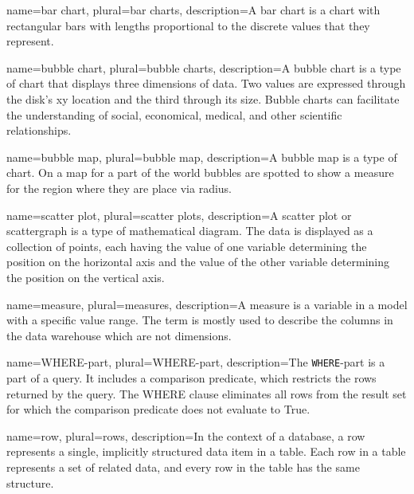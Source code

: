 {
  name=bar chart,
  plural=bar charts,
  description={A bar chart is a \gls{chart} with rectangular bars with lengths proportional to the discrete values that
  they represent.  
  }
}


{
  name=bubble chart,
  plural=bubble charts,
  description={A bubble chart is a type of chart that displays three 
  dimensions of data. Two values are expressed through the disk's xy location and the third 
  through its size. Bubble charts can facilitate the understanding of social,
economical, medical, and other scientific relationships. %
}
}

{
  name=bubble map,
  plural=bubble map,
  description={A bubble map is a type of chart. On a map for a part of the world bubbles are spotted to show a measure
  for the region where they are place via radius. 
}
}


{
  name=scatter plot,
  plural=scatter plots,
  description={A scatter plot or scattergraph is a type of mathematical diagram. 
  The data is displayed as a collection of points, each having the value of one 
  variable determining the position on the horizontal axis and the value of the other 
  variable determining the position on the vertical axis. 
  }
}


{
  name=measure,
  plural=measures,
  description={A measure is a variable in a model with a specific value range. The term is mostly used 
  to describe the columns in the data warehouse which are not dimensions.}
}


{
  name=WHERE-part,
  plural=WHERE-part,
  description={The \texttt{WHERE}-part is a part of a \gls{query}. It includes a comparison predicate, 
  which restricts the \glspl{row} returned by the \gls{query}. 
  The WHERE clause eliminates all rows from the result set 
  for which the comparison predicate does not evaluate to True.}
}


{
  name=row,
  plural=rows,
  description={In the context of a \gls{database}, a row represents a single, implicitly 
  structured data item in a table. Each row in a table represents a set of related data, 
  and every row in the table has the same structure.
  }
}


